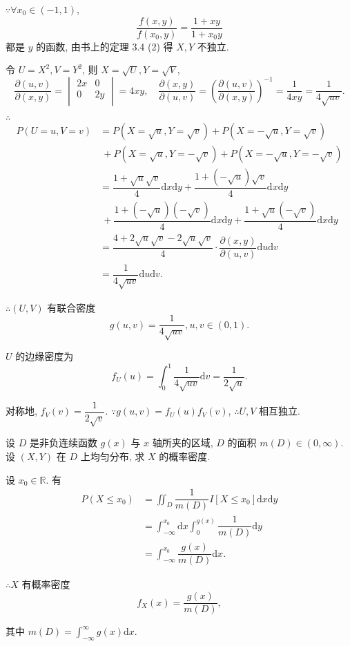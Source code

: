 \documentclass{ctexart}
\begin{document}
\begin{solution}
    $\because\forall x_0\in(-1,1)$,
    \[\dfrac{f(x,y)}{f(x_0,y)}=\dfrac{1+xy}{1+x_0y}\]
    都是 $y$ 的函数, 由书上的定理 3.4 (2) 得 $X,Y$ 不独立.

    令 $U=X^2,V=Y^2$, 则 $X=\sqrt{U},Y=\sqrt{V}$,
    \[\dfrac{\partial(u,v)}{\partial(x,y)}=\begin{vmatrix}
        2x & 0 \\
        0 & 2y \\
    \end{vmatrix}=4xy,\quad\dfrac{\partial(x,y)}{\partial(u,v)}=\left(\dfrac{\partial(u,v)}{\partial(x,y)}\right)^{-1}=\dfrac{1}{4xy}=\dfrac{1}{4\sqrt{uv}}.\]

    $\therefore$
    \begin{align*}
        P(U=u,V=v) & =P(X=\sqrt{u},Y=\sqrt{v})+P(X=-\sqrt{u},Y=\sqrt{v}) \\
        &\ +P(X=\sqrt{u},Y=-\sqrt{v})+P(X=-\sqrt{u},Y=-\sqrt{v}) \\
        & =\dfrac{1+\sqrt{u}\sqrt{v}}{4}\mathrm{d}x\mathrm{d}y+\dfrac{1+(-\sqrt{u})\sqrt{v}}{4}\mathrm{d}x\mathrm{d}y \\
        &\ +\dfrac{1+(-\sqrt{u})(-\sqrt{v})}{4}\mathrm{d}x\mathrm{d}y+\dfrac{1+\sqrt{u}(-\sqrt{v})}{4}\mathrm{d}x\mathrm{d}y \\
        & =\dfrac{4+2\sqrt{u}\sqrt{v}-2\sqrt{u}\sqrt{v}}{4}\cdot\dfrac{\partial(x,y)}{\partial(u,v)}\mathrm{d}u\mathrm{d}v \\
        & =\dfrac{1}{4\sqrt{uv}}\mathrm{d}u\mathrm{d}v.
    \end{align*}

    $\therefore(U,V)$ 有联合密度
    \[g(u,v)=\dfrac{1}{4\sqrt{uv}},u,v\in(0,1).\]

    $U$ 的边缘密度为
    \[f_U(u)=\int_0^1\dfrac{1}{4\sqrt{uv}}\mathrm{d}v=\dfrac{1}{2\sqrt{u}}.\]

    对称地, $f_V(v)=\dfrac{1}{2\sqrt{v}}$. $\because g(u,v)=f_U(u)f_V(v)$, $\therefore U,V$ 相互独立.
\end{solution}
\begin{exercise}%
    设 $D$ 是非负连续函数 $g(x)$ 与 $x$ 轴所夹的区域, $D$ 的面积 $m(D)\in(0,\infty)$. 设 $(X,Y)$ 在 $D$ 上均匀分布, 求 $X$ 的概率密度.
\end{exercise}
\begin{solution}
    设 $x_0\in\mathbb{R}$. 有
    \begin{align*}
        P(X\leq x_0) & =\iint_D\dfrac{1}{m(D)}I[X\leq x_0]\mathrm{d}x\mathrm{d}y \\
        & =\int_{-\infty}^{x_0}\mathrm{d}x\int_0^{g(x)}\dfrac{1}{m(D)}\mathrm{d}y \\
        & =\int_{-\infty}^{x_0}\dfrac{g(x)}{m(D)}\mathrm{d}x.
    \end{align*}

    $\therefore X$ 有概率密度
    \[f_X(x)=\dfrac{g(x)}{m(D)},\]

    其中 $m(D)=\int_{-\infty}^\infty g(x)\mathrm{d}x$.
\end{solution}
\end{document}
